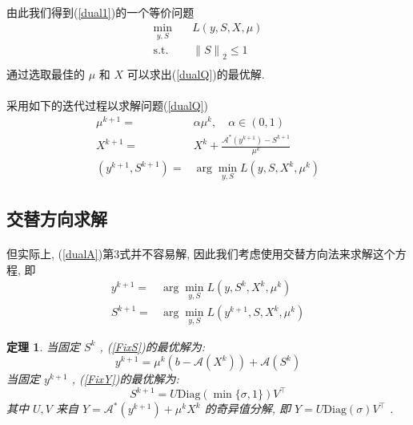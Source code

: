\documentclass[a4paper, UTF8]{ctexart}				%
\newtheorem{theo}{\bf 定理}[section]			  %
\numberwithin{equation}{section}				%
\begin{document}
			\paragraph{}
				\quad 由此我们得到(\ref{dual1})的一个等价问题
				\begin{equation}
					\begin{split}\label{dualQ}
						\min_{y,S} \quad
							& L(y, S, X, \mu)\\
						\text{s.t.} \quad
							& {\lVert{S}\rVert}_2 \le 1\\
					\end{split}
				\end{equation}
				通过选取最佳的 $\mu$ 和 $X$ 可以求出(\ref{dualQ})的最优解.


			\paragraph{}
				\quad 采用如下的迭代过程以求解问题(\ref{dualQ})
				\begin{equation}
					\begin{split}\label{dualA}
							\mu^{k + 1}
						=	& \alpha \mu^k, \quad \alpha \in (0,1)\\
							X^{k + 1}
						=	& X^k + \frac{\mathcal{A}^*(y^{k + 1}) - S^{k + 1}}{\mu^k}\\
							(y^{k + 1}, S^{k + 1}) 
						=	& \arg \min_{y, S}L(y, S, X^k, \mu^k)
					\end{split}
				\end{equation}
		\subsection{交替方向求解}
			\paragraph{}
				\quad 但实际上, (\ref{dualA})第3式并不容易解, 因此我们考虑使用交替方向法来求解这个方程, 即
				\begin{align}
						y^{k + 1}
					=	& \arg \min_{y, S}L(y, S^k, X^k, \mu^k) \label{FixS}\\
						S^{k + 1}
					=	& \arg \min_{y, S}L(y^{k + 1}, S, X^k, \mu^k) \label{FixY}
				\end{align}
			
			\begin{theo}
				当固定 $S^k$ , (\ref{FixS})的最优解为:
					\begin{equation}\label{dualAY}
						y^{k + 1} = \mu^k(b - \mathcal{A}(X^k)) + \mathcal{A}(S^k)
					\end{equation}
				当固定 $y^{k + 1}$ , (\ref{FixY})的最优解为:
					\begin{equation}\label{dualAS}
						S^{k + 1} = U \text{Diag}(\min \{\sigma, 1\}) V^\top
					\end{equation}
				其中 $U, V$ 来自 $Y = \mathcal{A}^*(y^{k + 1}) + \mu^k X^k$ 的奇异值分解, 即 $Y = U \text{Diag}(\sigma) V^\top$ .
			\end{theo}
\end{document}
